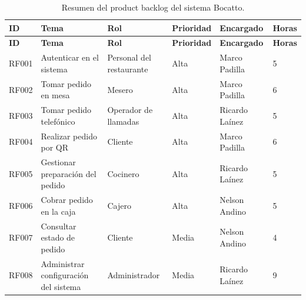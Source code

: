\documentclass[a4paper, 11pt]{article}
\begin{document}
{\small
\begin{longtable}{|p{1.2cm}|p{3.3cm}|p{2.7cm}|p{1.5cm}|p{2.4cm}|p{1.1cm}|}
\caption{Resumen del product backlog del sistema Bocatto.}\label{tab:backlog}\\
\hline
\textbf{ID} & \textbf{Tema} & \textbf{Rol} & \textbf{Prioridad} & \textbf{Encargado} & \textbf{Horas} \\ \hline
\endfirsthead
\hline
\textbf{ID} & \textbf{Tema} & \textbf{Rol} & \textbf{Prioridad} & \textbf{Encargado} & \textbf{Horas} \\ \hline
\endhead
RF001 & Autenticar en el sistema & Personal del restaurante & Alta & Marco Padilla & 5 \\ \hline
RF002 & Tomar pedido en mesa & Mesero & Alta & Marco Padilla & 6 \\ \hline
RF003 & Tomar pedido telefónico & Operador de llamadas & Alta & Ricardo Laínez & 5 \\ \hline
RF004 & Realizar pedido por QR & Cliente & Alta & Marco Padilla & 6 \\ \hline
RF005 & Gestionar preparación del pedido & Cocinero & Alta & Ricardo Laínez & 5 \\ \hline
RF006 & Cobrar pedido en la caja & Cajero & Alta & Nelson Andino & 5 \\ \hline
RF007 & Consultar estado de pedido & Cliente & Media & Nelson Andino & 4 \\ \hline
RF008 & Administrar configuración del sistema & Administrador & Media & Ricardo Laínez & 9 \\ \hline
\end{longtable}
}
\end{document}
